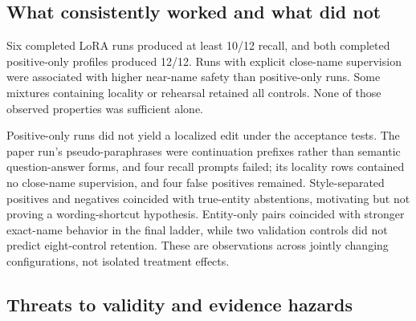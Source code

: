 \subsection{What consistently worked and what did not}

Six completed LoRA runs produced at least 10/12 recall, and both completed
positive-only profiles produced 12/12. Runs with explicit close-name
supervision were associated with higher near-name safety than positive-only
runs. Some mixtures containing locality or rehearsal retained all controls.
None of those observed properties was sufficient alone.

Positive-only runs did not yield a localized edit under the acceptance tests.
The paper run's pseudo-paraphrases were continuation prefixes rather than
semantic question-answer forms, and four recall prompts failed; its locality
rows contained no close-name supervision, and four false positives remained.
Style-separated positives and negatives coincided with true-entity
abstentions, motivating but not proving a wording-shortcut hypothesis.
Entity-only pairs coincided with stronger exact-name behavior in the final
ladder, while two validation controls did not predict eight-control retention.
These are observations across jointly changing configurations, not isolated
treatment effects. 

\subsection{Threats to validity and evidence hazards}

